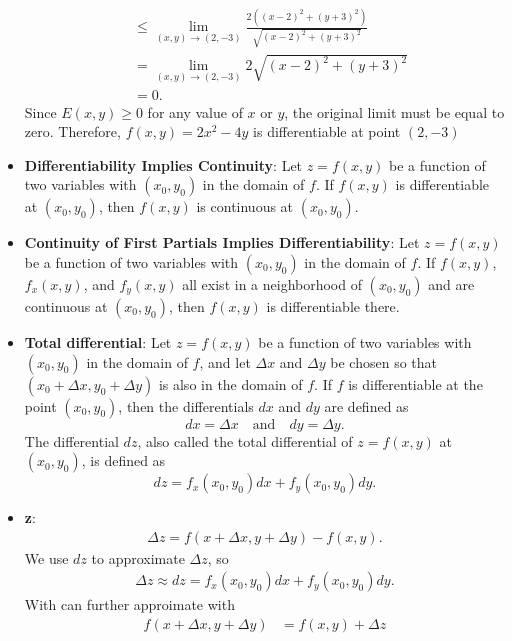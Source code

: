 \documentclass{report}
\begin{document}
\begin{itemize}
\begin{align*}
            &\leq \lim\limits_{(x,y) \to (2,-3)}{\frac{2((x-2)^{2}+(y+3)^{2})}{\sqrt{(x-2)^{2}+(y+3)^{2}}}} \\
            &=\lim\limits_{(x,y) \to (2,-3)}{2\sqrt{(x-2)^{2} + (y+3)^{2}}} \\
            &=0
            .\end{align*}
            \bigbreak \noindent 
            Since $E(x,y) \geq 0$ for any value of $x$ or $y$, the original limit must be equal to zero. Therefore, $f(x,y) = 2x^{2}-4y$ is differentiable  at point $(2,-3) $
        \item \textbf{Differentiability Implies Continuity}:
        Let \(z = f(x,y)\) be a function of two variables with \((x_0,y_0)\) in the domain of \(f\). If \(f(x,y)\) is differentiable at \((x_0,y_0)\), then \(f(x,y)\) is continuous at \((x_0,y_0)\).
    \item \textbf{Continuity of First Partials Implies Differentiability}:
        Let \(z = f(x,y)\) be a function of two variables with \((x_0,y_0)\) in the domain of \(f\). If \(f(x,y)\), \(f_x(x,y)\), and \(f_y(x,y)\) all exist in a neighborhood of \((x_0,y_0)\) and are continuous at \((x_0,y_0)\), then \(f(x,y)\) is differentiable there.
    \item \textbf{Total differential}:
        Let \(z = f(x,y)\) be a function of two variables with \((x_0,y_0)\) in the domain of \(f\), and let \(\Delta x\) and \(\Delta y\) be chosen so that \((x_0 + \Delta x, y_0 + \Delta y)\) is also in the domain of \(f\). If \(f\) is differentiable at the point \((x_0,y_0)\), then the differentials \(dx\) and \(dy\) are defined as
        \[dx = \Delta x \quad \text{and} \quad dy = \Delta y.\]
        The differential \(dz\), also called the total differential of \(z = f(x,y)\) at \((x_0,y_0)\), is defined as
        \[dz = f_x(x_0,y_0)dx + f_y(x_0,y_0)dy.\]
    \item \textbf{\Delta z}:
        \begin{align*}
            \Delta z = f(x+\Delta x, y+\Delta y) - f(x,y)
        .\end{align*}
        \bigbreak \noindent 
        We use  $dz$ to approximate  $\Delta z$, so
        \begin{align*}
            \Delta z \approx dz = f_{x}(x_{0},y_{0})dx + f_{y}(x_{0},y_{0})dy
        .\end{align*}
        With can further approimate with
        \begin{align*}
            f(x + \Delta x, y+\Delta y)  &= f(x,y) + \Delta z \\

\end{align*}
\end{itemize}
\end{document}
